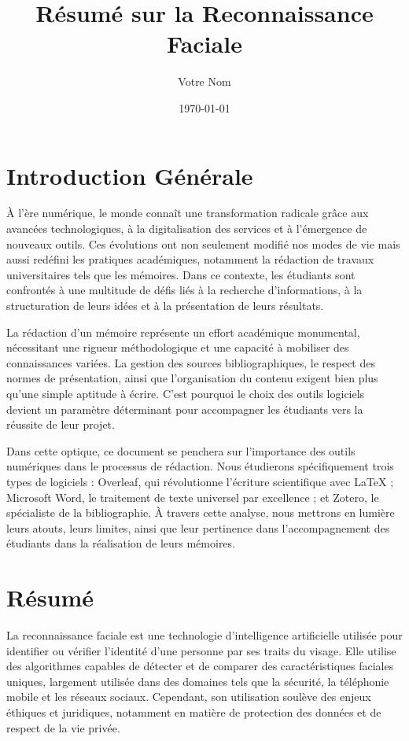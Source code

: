 \documentclass[12pt,a4paper]{article}
\begin{document}
\section{Introduction Générale}

À l'ère numérique, le monde connaît une transformation radicale grâce aux avancées technologiques, à la digitalisation des services et à l'émergence de nouveaux outils. Ces évolutions ont non seulement modifié nos modes de vie mais aussi redéfini les pratiques académiques, notamment la rédaction de travaux universitaires tels que les mémoires. Dans ce contexte, les étudiants sont confrontés à une multitude de défis liés à la recherche d'informations, à la structuration de leurs idées et à la présentation de leurs résultats.

La rédaction d'un mémoire représente un effort académique monumental, nécessitant une rigueur méthodologique et une capacité à mobiliser des connaissances variées. La gestion des sources bibliographiques, le respect des normes de présentation, ainsi que l'organisation du contenu exigent bien plus qu'une simple aptitude à écrire. C'est pourquoi le choix des outils logiciels devient un paramètre déterminant pour accompagner les étudiants vers la réussite de leur projet.

Dans cette optique, ce document se penchera sur l'importance des outils numériques dans le processus de rédaction. Nous étudierons spécifiquement trois types de logiciels : Overleaf, qui révolutionne l'écriture scientifique avec LaTeX ; Microsoft Word, le traitement de texte universel par excellence ; et Zotero, le spécialiste de la bibliographie. À travers cette analyse, nous mettrons en lumière leurs atouts, leurs limites, ainsi que leur pertinence dans l'accompagnement des étudiants dans la réalisation de leurs mémoires.

\title{Résumé sur la Reconnaissance Faciale}
\author{Votre Nom} %
\date{\today}
\maketitle

\section{Résumé}

La reconnaissance faciale est une technologie d'intelligence artificielle utilisée pour identifier ou vérifier l'identité d'une personne par ses traits du visage. Elle utilise des algorithmes capables de détecter et de comparer des caractéristiques faciales uniques, largement utilisée dans des domaines tels que la sécurité, la téléphonie mobile et les réseaux sociaux. Cependant, son utilisation soulève des enjeux éthiques et juridiques, notamment en matière de protection des données et de respect de la vie privée.
\end{document}
